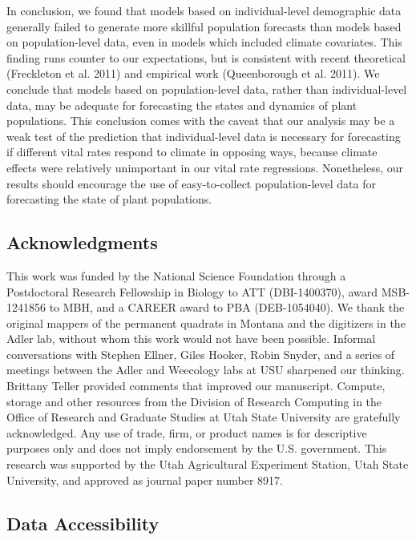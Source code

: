 \documentclass[12pt,]{article}
\begin{document}
In conclusion, we found that models based on individual-level
demographic data generally failed to generate more skillful population
forecasts than models based on population-level data, even in models
which included climate covariates. This finding runs counter to our
expectations, but is consistent with recent theoretical (Freckleton et
al. 2011) and empirical work (Queenborough et al. 2011). We conclude
that models based on population-level data, rather than individual-level
data, may be adequate for forecasting the states and dynamics of plant
populations. This conclusion comes with the caveat that our analysis may
be a weak test of the prediction that individual-level data is necessary
for forecasting if different vital rates respond to climate in opposing
ways, because climate effects were relatively unimportant in our vital
rate regressions. Nonetheless, our results should encourage the use of
easy-to-collect population-level data for forecasting the state of plant
populations.

\subsection{Acknowledgments}\label{acknowledgments}

This work was funded by the National Science Foundation through a
Postdoctoral Research Fellowship in Biology to ATT (DBI-1400370), award
MSB-1241856 to MBH, and a CAREER award to PBA (DEB-1054040). We thank
the original mappers of the permanent quadrats in Montana and the
digitizers in the Adler lab, without whom this work would not have been
possible. Informal conversations with Stephen Ellner, Giles Hooker,
Robin Snyder, and a series of meetings between the Adler and Weecology
labs at USU sharpened our thinking. Brittany Teller provided comments
that improved our manuscript. Compute, storage and other resources from
the Division of Research Computing in the Office of Research and
Graduate Studies at Utah State University are gratefully acknowledged.
Any use of trade, firm, or product names is for descriptive purposes
only and does not imply endorsement by the U.S. government. This
research was supported by the Utah Agricultural Experiment Station, Utah
State University, and approved as journal paper number 8917.

\subsection{Data Accessibility}\label{data-accessibility}
\end{document}
